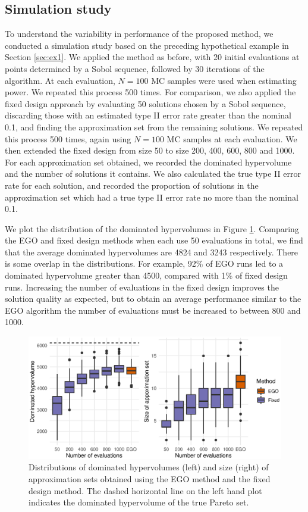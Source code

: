 \documentclass[sagev, Crown]{sagej}
\begin{document}
\subsection{Simulation study}

To understand the variability in performance of the proposed method, we conducted a simulation study based on the preceding hypothetical example in Section \ref{sec:ex1}. We applied the method as before, with 20 initial evaluations at points determined by a Sobol sequence, followed by 30 iterations of the algorithm. At each evaluation, $N = 100$ MC samples were used when estimating power. We repeated this process 500 times. For comparison, we also applied the fixed design approach by evaluating 50 solutions chosen by a Sobol sequence, discarding those with an estimated type II error rate greater than the nominal 0.1, and finding the approximation set from the remaining solutions. We repeated this process 500 times, again using $N  = 100$ MC samples at each evaluation. We then extended the fixed design from size 50 to size 200, 400, 600, 800 and 1000. For each approximation set obtained, we recorded the dominated hypervolume and the number of solutions it contains. We also calculated the true type II error rate for each solution, and recorded the proportion of solutions in the approximation set which had a true type II error rate no more than the nominal 0.1.

We plot the distribution of the dominated hypervolumes in Figure \ref{fig:ex4_many_runs}. Comparing the EGO and fixed design methods when each use 50 evaluations in total, we find that the average dominated hypervolumes are 4824 and 3243 respectively. There is some overlap in the distributions. For example, 92\% of EGO runs led to a dominated hypervolume greater than 4500, compared with 1\% of fixed design runs. Increasing the number of evaluations in the fixed design improves the solution quality as expected, but to obtain an average performance similar to the EGO algorithm the number of evaluations must be increased to between 800 and 1000.

\begin{figure}
\centering
\includegraphics[scale=0.8]{./figures/ex4_many_runs.eps}
\caption{Distributions of dominated hypervolumes (left) and size (right) of approximation sets obtained using the EGO method and the fixed design method. The dashed horizontal line on the left hand plot indicates the dominated hypervolume of the true Pareto set.}
\label{fig:ex4_many_runs}
\end{figure}
\end{document}
